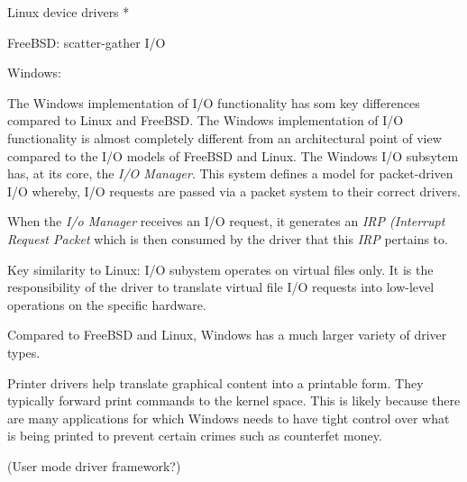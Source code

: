 	Linux device drivers *

	
FreeBSD: scatter-gather I/O 

Windows:

  The Windows implementation of I/O functionality has som key differences compared to Linux and FreeBSD.
  The Windows implementation of I/O functionality is almost completely different from an architectural point of view compared to the I/O models of FreeBSD and Linux. The Windows I/O subsytem has, at its core, the \textit{I/O Manager}.  This system defines a model for packet-driven I/O whereby, I/O requests are passed via a packet system to their correct drivers.
  
  When the \textit{I/o Manager} receives an I/O request, it generates an \textit{IRP (Interrupt Request Packet} which is then consumed by the driver that this \textit{IRP} pertains to.

  Key similarity to Linux: I/O subystem operates on virtual files only.  It is the responsibility of the driver to translate virtual file I/O requests into low-level operations on the specific hardware.

  Compared to FreeBSD and Linux, Windows has a much larger variety of driver types.
  
  Printer drivers  help translate graphical content into a printable form.  They typically forward print commands to the kernel space.  This is likely because there are many applications for which Windows needs to have tight control over what is being printed to prevent certain crimes such as counterfet money.

  (User mode driver framework?)

